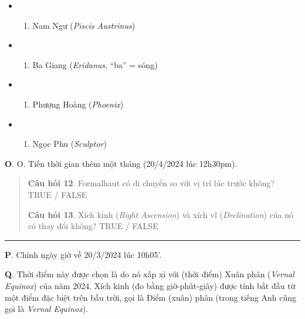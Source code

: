 \documentclass[
]{book}
\providecommand{\tightlist}{%
  \setlength{\itemsep}{0pt}\setlength{\parskip}{0pt}}
\begin{document}
\begin{itemize}
\tightlist
\item
  \begin{enumerate}
  \def\labelenumi{(\Alph{enumi})}
  \tightlist
  \item
    Nam Ngư (\emph{Piscis Austrinus})\\
  \end{enumerate}
\item
  \begin{enumerate}
  \def\labelenumi{(\Alph{enumi})}
  \setcounter{enumi}{1}
  \tightlist
  \item
    Ba Giang (\emph{Eridanus}, ``ba'' = sóng)\\
  \end{enumerate}
\item
  \begin{enumerate}
  \def\labelenumi{(\Alph{enumi})}
  \setcounter{enumi}{2}
  \tightlist
  \item
    Phượng Hoàng (\emph{Phoenix})\\
  \end{enumerate}
\item
  \begin{enumerate}
  \def\labelenumi{(\Alph{enumi})}
  \setcounter{enumi}{3}
  \tightlist
  \item
    Ngọc Phu (\emph{Sculptor})
  \end{enumerate}
\end{itemize}

\textbf{O}. O. Tiến thời gian thêm một tháng (20/4/2024 lúc 12h30pm).

\begin{quote}
\textbf{Câu hỏi 12}. Formalhaut có di chuyển so với vị trí lúc trước không?
TRUE / FALSE

\textbf{Câu hỏi 13}. Xích kinh (\emph{Right Ascension}) và xích vĩ (\emph{Declination}) của nó có thay đổi không?
TRUE / FALSE
\end{quote}

\begin{center}\rule{0.5\linewidth}{0.5pt}\end{center}

\textbf{P}. Chỉnh ngày giờ về 20/3/2024 lúc 10h05'.

\textbf{Q}. Thời điểm này được chọn là do nó xấp xỉ với (thời điểm) Xuân phân (\emph{Vernal Equinox}) của năm 2024. Xích kinh (đo bằng giờ-phút-giây) được tính bắt đầu từ một điểm đặc biệt trên bầu trời, gọi là Điểm (xuân) phân (trong tiếng Anh cũng gọi là \emph{Vernal Equinox}).
\end{document}
